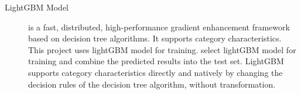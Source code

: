 \documentclass{tikzposter} %
\begin{document}
\begin{columns}
{
\begin{description}
    \item[LightGBM Model]
    is a fast, distributed, high-performance 
    gradient enhancement framework based on decision tree algorithms.
    It supports category characteristics.\\
    This project uses lightGBM model for training.
    select lightGBM model for training and combine the predicted results into the test set.
    LightGBM supports category characteristics directly and natively 
    by changing the decision rules of the decision tree algorithm, 
    without transformation.
\end{description}
\vspace{.5cm}



\vspace{.5cm}

}
\end{columns}
\end{document}
